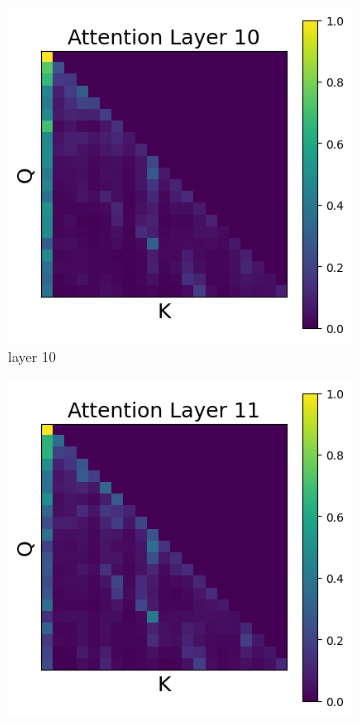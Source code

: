 \documentclass[11pt]{article}
\begin{document}
\begin{figure}[t]
    \begin{subfigure}[t]{0.24\textwidth}
    \centering
    \includegraphics[width=1.4\columnwidth]{figures/intervention1/layer_10.png}
    \caption{layer 10}
  \end{subfigure}\hfill
    \begin{subfigure}[t]{0.24\textwidth}
    \centering
    \includegraphics[width=1.4\columnwidth]{figures/intervention1/layer_11.png}

\end{subfigure}
\end{figure}
\end{document}
